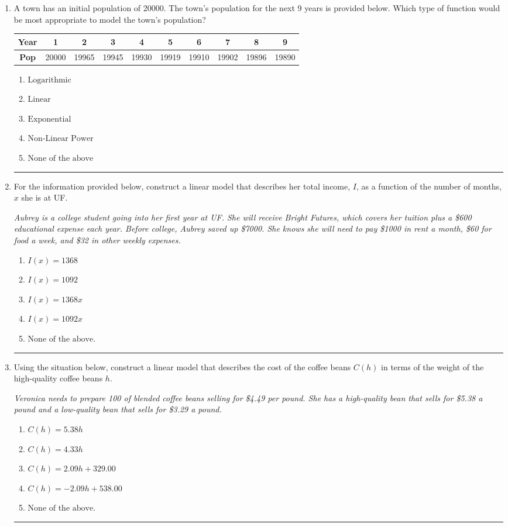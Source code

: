 \documentclass[14pt]{extbook}
\newcommand{\litem}[1]{\item#1\hspace*{-1cm}\rule{\textwidth}{0.4pt}}
\begin{document}
\begin{enumerate}
{\begin{enumerate}[label=\Alph*.]
\end{enumerate} }
\litem{
A town has an initial population of 20000. The town's population for the next 9 years is provided below. Which type of function would be most appropriate to model the town's population?

\begin{tabular}{c|c|c|c|c|c|c|c|c|c}
\textbf{Year} &1 &2 &3 &4 &5 &6 &7 &8 &9\tabularnewline \hline
\textbf{Pop} &20000 &19965 &19945 &19930 &19919 &19910 &19902 &19896 &19890\end{tabular}\begin{enumerate}[label=\Alph*.]
\item \( \text{Logarithmic} \)
\item \( \text{Linear} \)
\item \( \text{Exponential} \)
\item \( \text{Non-Linear Power} \)
\item \( \text{None of the above} \)

\end{enumerate} }
\litem{
For the information provided below, construct a linear model that describes her total income, $I$, as a function of the number of months, $x$ she is at UF.
\begin{center}
    \textit{ Aubrey is a college student going into her first year at UF. She will receive Bright Futures, which covers her tuition plus a \$600 educational expense each year. Before college, Aubrey saved up \$7000. She knows she will need to pay \$1000 in rent a month, \$60 for food a week, and \$32 in other weekly expenses. }
\end{center}
\begin{enumerate}[label=\Alph*.]
\item \( I(x) = 1368 \)
\item \( I(x) = 1092 \)
\item \( I(x) = 1368 x \)
\item \( I(x) = 1092 x \)
\item \( \text{None of the above.} \)

\end{enumerate} }
\litem{
Using the situation below, construct a linear model that describes the cost of the coffee beans $C(h)$ in terms of the weight of the high-quality coffee beans $h$.
\begin{center}
    \textit{ Veronica needs to prepare 100 of blended coffee beans selling for \$4.49 per pound. She has a high-quality bean that sells for \$5.38 a pound and a low-quality bean that sells for \$3.29 a pound. }
\end{center}
\begin{enumerate}[label=\Alph*.]
\item \( C(h) = 5.38 h \)
\item \( C(h) = 4.33 h \)
\item \( C(h) = 2.09 h + 329.00 \)
\item \( C(h) = -2.09 h + 538.00 \)
\item \( \text{None of the above.} \)


\end{enumerate}}
\end{enumerate}
\end{document}
